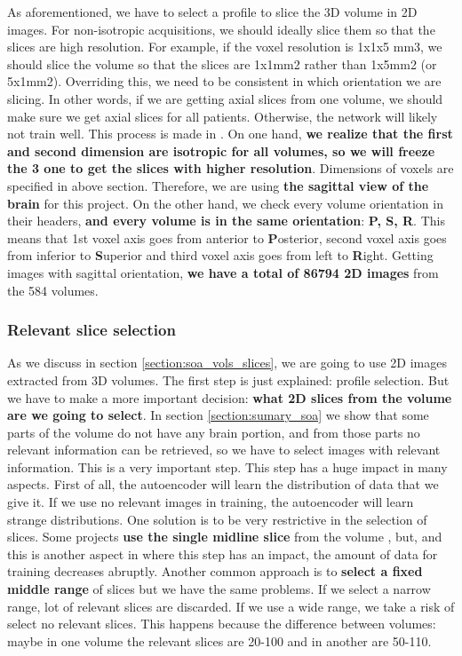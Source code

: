 As aforementioned, we have to select a profile to slice the 3D volume in 2D images. For non-isotropic acquisitions, we should ideally slice them so that the slices are high resolution. For example, if the voxel resolution is 1x1x5 mm3, we should slice the volume so that the slices are 1x1mm2 rather than 1x5mm2 (or 5x1mm2). Overriding this, we need to be consistent in which orientation we are slicing. In other words, if we are getting axial slices from one volume, we should make sure we get axial slices for all patients. Otherwise, the network will likely not train well. This process is made in . On one hand, \textbf{we realize that the first and second dimension are isotropic for all volumes, so we will freeze the 3 one to get the slices with higher resolution}. Dimensions of voxels are specified in above section. Therefore, we are using \textbf{the sagittal view of the brain} for this project. On the other hand, we check every volume orientation in their headers, \textbf{and every volume is in the same orientation}: \textbf{P, S, R}. This means that 1st voxel axis goes from anterior to \textbf{P}osterior, second voxel axis goes from inferior to \textbf{S}uperior and third voxel axis goes from left to \textbf{R}ight. Getting images with sagittal orientation, \textbf{we have a total of 86794 2D images} from the 584 volumes.

\subsubsection{Relevant slice selection}
\label{subsubsection:relevantsliceselection}

As we discuss in section \ref{section:soa_vols_slices}, we are going to use 2D images extracted from 3D volumes. The first step is just explained: profile selection. But we have to make a more important decision: \textbf{what 2D slices from the volume are we going to select}. In section \ref{section:sumary_soa} we show that some parts of the volume do not have any brain portion, and from those parts no relevant information can be retrieved, so we have to select images with relevant information. This is a very important step. This step has a huge impact in many aspects. First of all, the autoencoder will learn the distribution of data that we give it. If we use no relevant images in training, the autoencoder will learn strange distributions. One solution is to be very restrictive in the selection of slices. Some projects \textbf{use the single midline slice} from the volume \cite{bermudez2018t1autoencoder}, but, and this is another aspect in where this step has an impact, the amount of data for training decreases abruptly. Another common approach is to \textbf{select a fixed middle range} of slices but we have the same problems. If we select a narrow range, lot of relevant slices are discarded. If we use a wide range, we take a risk of select no relevant slices. This happens because the difference between volumes: maybe in one volume the relevant slices are 20-100 and in another are 50-110.

